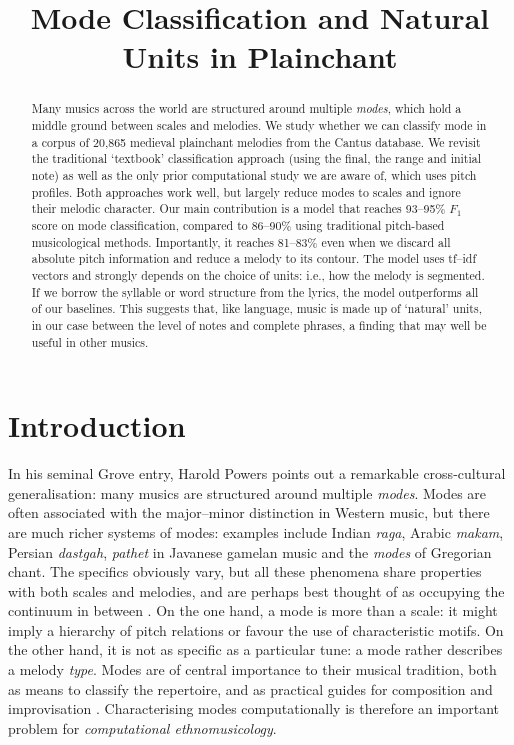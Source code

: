 \documentclass{article}
\title{Mode Classification and Natural Units in Plainchant}
\begin{document}
%
\maketitle
%
\begin{abstract}
Many musics across the world are structured around multiple \emph{modes}, which hold a middle ground between scales and melodies. 
We study whether we can classify mode in a corpus of 20,865 medieval plainchant melodies from the Cantus database.
We revisit the traditional `textbook' classification approach (using the final, the range and initial note) as well as the only prior computational study we are aware of, which uses pitch profiles.
Both approaches work well, but largely reduce modes to scales and ignore their melodic character.
Our main contribution is a model that reaches 93--95\% $F_1$ score on mode classification, compared to 86--90\% using traditional pitch-based musicological methods. Importantly, it reaches 81--83\% even when we discard all absolute pitch information and reduce a melody to its contour.
The model uses tf--idf vectors and strongly depends on the choice of units: i.e., how the melody is segmented.
If we borrow the syllable or word structure from the lyrics, the model outperforms all of our baselines. 
This suggests that, like language, music is made up of `natural' units, in our case between the level of notes and complete phrases,  a finding that may well be useful in other musics.
\end{abstract}



\section{Introduction}\label{sec:introduction}



In his seminal Grove entry, Harold Powers \cite{Powers2001} points out a remarkable cross-cultural generalisation: many musics are structured around multiple \emph{modes}.
Modes are often associated with the major--minor distinction in Western music, but there are much richer systems of modes:
examples include Indian \emph{raga}, Arabic \emph{makam}, Persian \emph{dastgah}, \emph{pathet} in Javanese gamelan music and the \emph{modes} of Gregorian chant.
The specifics obviously vary, but all these phenomena share properties with both scales and melodies, and are perhaps best thought of as occupying the continuum in between \cite{Powers2001}.
On the one hand, a mode is more than a scale: it might imply a hierarchy of pitch relations or favour the use of characteristic motifs.
On the other hand, it is not as specific as a particular tune: a mode rather describes a melody \emph{type}.
Modes are of central importance to their musical tradition, both as means to classify the repertoire, and as practical guides for composition and improvisation \cite{Powers2001}.
Characterising modes computationally is therefore an important problem for \emph{computational ethnomusicology}.
\end{document}
